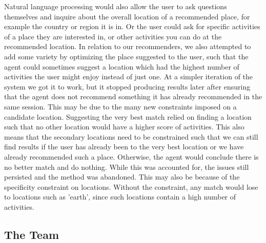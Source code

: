 \documentclass[11pt]{article} %
\begin{document}
Natural language processing would also allow the user to ask questions themselves and inquire about the overall location of a recommended place, for example the country or region it is in. Or the user could ask for specific activities of a place they are interested in, or other activities you can do at the recommended location. In relation to our recommenders, we also attempted to add some variety by optimizing the place suggested to the user, such that the agent could sometimes suggest a location which had the highest 
number of activities the user might enjoy instead of just one. At a simpler iteration of the system we got it to work, but it stopped producing results later after ensuring that the agent does not 
recommend something it has already recommended in the same session. This may be due to the many new constraints imposed on a candidate location. Suggesting the very best match relied on 
finding a location such that no other location would have a higher score of activities. This also means that the secondary locations need to be constrained such that we can still find results 
if the user has already been to the very best location or we have already recommended such a place. Otherwise, the agent would conclude there is no better match and do nothing. While this was 
accounted for, the issues still persisted and the method was abandoned. This may also be because of the specificity constraint on locations. Without the constraint, any match would lose to locations such as 'earth',
 since such locations contain a high number of activities.

 
\subsection{The Team}
\end{document}
